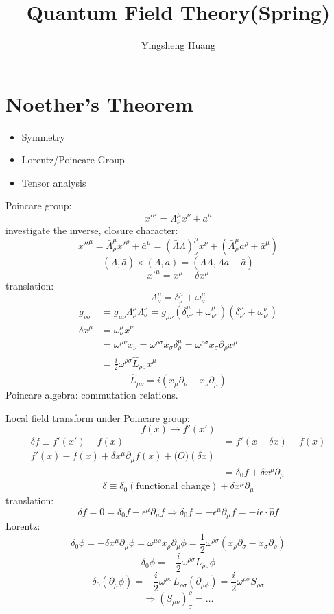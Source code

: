 \documentclass{article}
\title{Quantum Field Theory(Spring)}
\author{Yingsheng Huang}
\newcommand{\s}{\sigma}
\renewcommand{\L}{\Lambda}
\begin{document}
\maketitle
\section{Noether's Theorem}
\begin{itemize}
  \item Symmetry
  \item Lorentz/Poincare Group
  \item Tensor analysis
\end{itemize}
Poincare group: 
$$x'^{\mu}=\L^{\mu}_{\nu}x^{\nu}+a^{\mu}$$
investigate the inverse, closure character:
$$x''^{\mu}=\bar\L^{\mu}_{\rho}x'^{\rho}+\bar a^{\mu}=(\bar \L\L)^{\mu}_{\nu}x^{\nu}+(\bar \L^{\mu}_{\rho}a^{\rho}+\bar a^{\mu})$$
$$(\bar \L,\bar a)\times(\L,a)=(\bar \L\L,\bar\L a+\bar a)$$
$$x'^{\mu}=x^{\mu}+\delta x^{\mu}$$
translation:
$$\L^{\mu}_{\nu}=\delta^{\mu}_{\nu}+\omega^{\mu}_{\nu}$$
\begin{align*}
  g_{\rho\s}&=g_{\mu\nu}\L^{\mu}_{\rho}\L^{\nu}_{\s}=g_{\mu\nu}(\delta^{\mu}_{\nu''}+\omega^{\mu}_{\nu''})(\delta^{\nu}_{\nu'}+\omega^{\nu}_{\nu'}) \\
  \delta x^{\mu}&=\omega^{\mu}_{\nu}x^{\nu}\\
  &=\omega^{\mu\nu}x_{\nu}=\omega^{\rho\s}x_{\s}\delta^{\mu}_{\rho}=\omega^{\rho\s}x_{\s}\partial_{\rho}x^{\mu}\\
  &=\frac{i}{2}\omega^{\rho\s}\hat L_{\rho\s}x^{\mu}
\end{align*}
$$\hat L_{\mu\nu}=i(x_{\mu}\partial_{\nu}-x_{\nu}\partial_{\mu})$$
Poincare algebra: commutation relations.

Local field transform under Poincare group:
$$f(x)\rightarrow f'(x')$$
\begin{align*}
  \delta f\equiv f'(x')-f(x)&=f'(x+\delta x)-f(x)\\
  f'(x)-f(x)+\delta x^{\mu}\partial_{\mu}f(x)+\mathcal(O)(\delta x)\\
  &=\delta_0f+\delta x^{\mu}\partial_{\mu}
\end{align*}
$$\delta\equiv\delta_0(\text{functional change})+\delta x^{\mu}\partial_{\mu}$$
translation: 
$$\delta f=0=\delta_0f+\epsilon^{\mu}\partial_{\mu}f\Longrightarrow\delta_0f=-\epsilon^{\mu}\partial_{\mu}f=-i\epsilon\cdot\hat pf$$
Lorentz:
$$\delta_0\phi=-\delta x^{\mu}\partial_{\mu}\phi=\omega^{\mu\rho}x_{\rho}\partial_{\mu}\phi=\frac{1}{2}\omega^{\rho\s}(x_{\rho}\partial_{\s}-x_{\s}\partial_{\rho})$$
$$\delta_0\phi=-\frac{i}{2}\omega^{\rho\s}L_{\rho\s}\phi$$
$$\delta_0(\partial_{\mu}\phi)=-\frac{i}{2}\omega^{\rho\s}L_{\rho\s}(\partial_{\mu\phi})=\frac{i}{2}\omega^{\rho\s}S_{\rho\s}$$
$$\Longrightarrow(S_{\mu\nu})^{\rho}_{\s}=\dots$$
\end{document}
